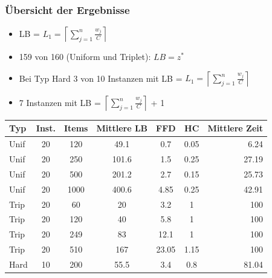 \documentclass{beamer}
\begin{document}
\begin{frame}
\frametitle{Übersicht der Ergebnisse}
\begin{footnotesize}
\begin{itemize}
\item LB = $L_1 = \left\lceil\sum_{j=1}^{n} \frac{w_j}{C}\right\rceil$
\item 159 von 160 (Uniform und Triplet): $LB = z^{*}$
\item Bei Typ Hard 3 von 10 Instanzen mit LB = $L_1 = \left\lceil\sum_{j=1}^{n} \frac{w_j}{C}\right\rceil$
\item 7 Instanzen mit LB = $\left\lceil\sum_{j=1}^{n} \frac{w_j}{C}\right\rceil$ + 1
\end{itemize}
\end{footnotesize}
\begin{table}
\begin{tabular}{l c c c c c r}
\toprule
\textbf{Typ} & \textbf{Inst.} & \textbf{Items} & \textbf{Mittlere LB} & \textbf{FFD} & \textbf{HC} & \textbf{Mittlere Zeit}\\
\midrule
Unif  & 20   & 120 & 49.1  & 0.7 & 0.05 & 6.24 \\
Unif  & 20   & 250  & 101.6  & 1.5 & 0.25 & 27.19 \\
Unif  & 20   & 500  & 201.2  & 2.7 & 0.15 & 25.73\\
Unif  & 20   & 1000  & 400.6  & 4.85 & 0.25 & 42.91\\ \midrule
Trip  & 20   & 60   & 20  & 3.2 & 1 & 100 \\
Trip  & 20   & 120  & 40  & 5.8 & 1 & 100 \\
Trip  & 20   & 249  & 83  & 12.1 & 1 & 100 \\
Trip  & 20   & 510  & 167  & 23.05 & 1.15 & 100 \\\midrule
Hard  & 10   & 200  & 55.5  & 3.4 & 0.8 &  81.04 \\
\bottomrule
\end{tabular}
\end{table}
\end{frame}


\end{document}
